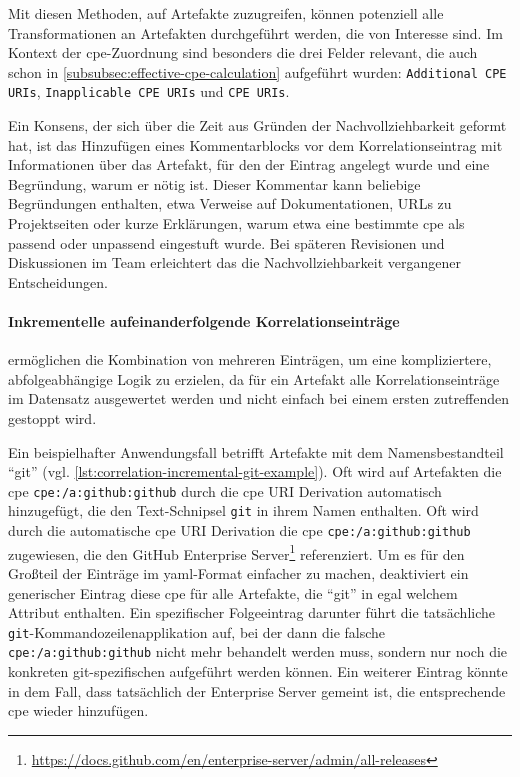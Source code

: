 \bigskip

Mit diesen Methoden, auf Artefakte zuzugreifen, können potenziell alle Transformationen an Artefakten durchgeführt werden, die von Interesse sind.
Im Kontext der \acrshort{cpe}-Zuordnung sind besonders die drei Felder relevant, die auch schon in \autoref{subsubsec:effective-cpe-calculation} aufgeführt wurden:
\texttt{Additional CPE URIs}, \texttt{Inapplicable CPE URIs} und \texttt{CPE URIs}.

Ein Konsens, der sich über die Zeit aus Gründen der Nachvollziehbarkeit geformt hat, ist das Hinzufügen eines Kommentarblocks vor dem Korrelationseintrag mit Informationen über das Artefakt, für den der Eintrag angelegt wurde und eine Begründung, warum er nötig ist.
Dieser Kommentar kann beliebige Begründungen enthalten, etwa Verweise auf Dokumentationen, URLs zu Projektseiten oder kurze Erklärungen, warum etwa eine bestimmte \acrshort{cpe} als passend oder unpassend eingestuft wurde.
Bei späteren Revisionen und Diskussionen im Team erleichtert das die Nachvollziehbarkeit vergangener Entscheidungen.

\paragraph{Inkrementelle aufeinanderfolgende Korrelationseinträge}\label{par:incremental-correlation-entries}
ermöglichen die Kombination von mehreren Einträgen, um eine kompliziertere, abfolgeabhängige Logik zu erzielen, da für ein Artefakt alle Korrelationseinträge im Datensatz ausgewertet werden und nicht einfach bei einem ersten zutreffenden gestoppt wird.

Ein beispielhafter Anwendungsfall betrifft Artefakte mit dem Namensbestandteil \enquote{git} (vgl. \autoref{lst:correlation-incremental-git-example}).
Oft wird auf Artefakten die \acrshort{cpe} \texttt{cpe:/a:github:github} durch die \acrshort{cpe} URI Derivation automatisch hinzugefügt, die den Text-Schnipsel \texttt{git} in ihrem Namen enthalten.
Oft wird durch die automatische \acrshort{cpe} URI Derivation die \acrshort{cpe} \texttt{cpe:/a:github:github} zugewiesen, die den GitHub Enterprise Server\footnote{\url{https://docs.github.com/en/enterprise-server/admin/all-releases}} referenziert.
Um es für den Großteil der Einträge im \acrshort{yaml}-Format einfacher zu machen, deaktiviert ein generischer Eintrag diese \acrshort{cpe} für alle Artefakte, die \enquote{git} in egal welchem Attribut enthalten.
Ein spezifischer Folgeeintrag darunter führt die tatsächliche \texttt{git}-Kommandozeilenapplikation auf, bei der dann die falsche \texttt{cpe:/a:github:github} nicht mehr behandelt werden muss, sondern nur noch die konkreten git-spezifischen  aufgeführt werden können.
Ein weiterer Eintrag könnte in dem Fall, dass tatsächlich der Enterprise Server gemeint ist, die entsprechende \acrshort{cpe} wieder hinzufügen.


